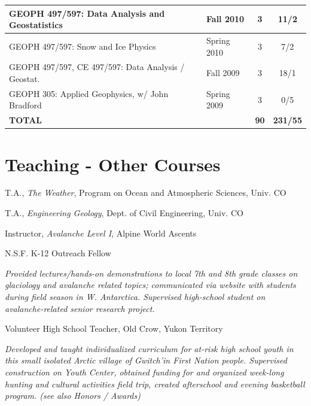\documentclass[11pt]{article}
\renewenvironment{itemize}{
  \begin{list}{}{
    \setlength{\leftmargin}{1.5em}
    \setlength{\itemsep}{0pt}
    \setlength{\parskip}{0pt}
  }
}{
  \end{list}
}
\begin{document}
\begin{table}[!htbp]
\begin{tabular}{|l|l|c|c|}
GEOPH 497/597: Data Analysis and Geostatistics & Fall 2010 & 3 & 11/2 \\ \hline
GEOPH 497/597: Snow and Ice Physics & Spring 2010 & 3 & 7/2 \\ \hline
GEOPH 497/597, CE 497/597: Data Analysis / Geostat. & Fall 2009 & 3 & 18/1  \\ \hline
GEOPH 305: Applied Geophysics, w/ John Bradford & Spring 2009 & 3 & 0/5 \\ \hline
\textbf{TOTAL} &  & \textbf{90} & \textbf{231/55} \\ \hline
\end{tabular}
\end{table}


\section*{Teaching - Other Courses}
\begin{itemize}
\item[01/2003-06/2003] T.A., \textit{The Weather}, Program on Ocean and Atmospheric Sciences, Univ. CO
\item[01/2000-06/2000] T.A., \textit{Engineering Geology}, Dept. of Civil Engineering, Univ. CO
\item[12/2002-12/2003] Instructor, \textit{Avalanche Level I}, Alpine World Ascents
\item[08/2001-06/2002] N.S.F. K-12 Outreach Fellow
\item \textit{Provided lectures/hands-on demonstrations to local 7th and 8th grade 
classes on glaciology and avalanche related topics; communicated via website with students 
during field season in W. Antarctica. Supervised high-school student on avalanche-related 
senior research project.}

\item[09/1999-03/2000] Volunteer High School Teacher, Old Crow, Yukon Territory
\item \textit{Developed and taught individualized curriculum for at-risk high school youth in this 
small isolated Arctic village of Gwitch'in First Nation people.  Supervised construction 
on Youth Center, obtained funding for and organized week-long hunting and cultural 
activities field trip, created afterschool and evening basketball program. (see also Honors 
/ Awards)}
\end{itemize}
\end{document}
